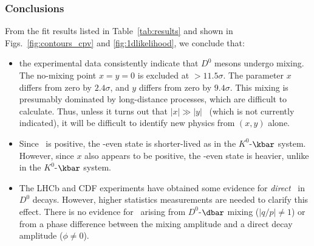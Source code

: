 
\subsubsection{Conclusions}

From the fit results listed in Table~\ref{tab:results}
and shown in Figs.~\ref{fig:contours_cpv} and \ref{fig:1dlikelihood},
we conclude that:
\begin{itemize}
\item the experimental data consistently indicate that 
$D^0$ mesons undergo mixing. The no-mixing point $x=y=0$
is excluded at $>11.5\sigma$. The parameter $x$ differs
from zero by $2.4\sigma$, and $y$ differs from zero by
$9.4\sigma$. This mixing is presumably dominated 
by long-distance processes, which are difficult to calculate.
Thus, unless it turns out that $|x|\gg |y|$~\cite{Bigi:2000wn}
(which is not currently indicated), it will be difficult to
identify new physics from $(x,y)$ alone.
\item Since \ycp\ is positive, the \cp-even state is shorter-lived
as in the $K^0$-$\kbar$ system. However, since $x$ also appears
to be positive, the \cp-even state is heavier, 
unlike in the $K^0$-$\kbar$ system.
\item The LHCb and CDF experiments have obtained some evidence
for {\it direct\/} \cpv\ in $D^0$ decays. However, higher
statistics measurements are needed to clarify this effect.
There is no evidence for \cpv\ arising from $D^0$-$\dbar$
mixing ($|q/p|\neq 1$) or from a phase difference between
the mixing amplitude and a direct decay amplitude ($\phi\neq 0$). 
\end{itemize}

